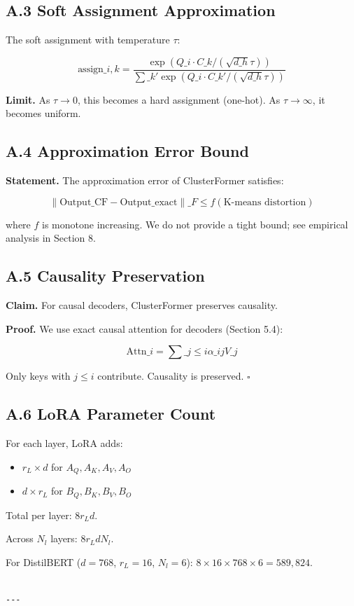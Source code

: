 \subsection{A.3 Soft Assignment Approximation}

The soft assignment with temperature $\tau$:

\[
\text{assign}\_{i,k} = \frac{\exp(Q\_i \cdot C\_k / (\sqrt{d\_h} \tau))}{\sum\_{k'} \exp(Q\_i \cdot C\_{k'} / (\sqrt{d\_h} \tau))}
\]

\textbf{Limit.} As $\tau \to 0$, this becomes a hard assignment (one-hot). As 
$\tau \to \infty$, it becomes uniform.

\subsection{A.4 Approximation Error Bound}

\textbf{Statement.} The approximation error of ClusterFormer satisfies:

\[
\|\text{Output}\_\text{CF} - \text{Output}\_\text{exact}\|\_F \leq f(\text{K-means distortion})
\]

where $f$ is monotone increasing. We do not provide a tight bound; see 
empirical analysis in Section 8.

\subsection{A.5 Causality Preservation}

\textbf{Claim.} For causal decoders, ClusterFormer preserves causality.

\textbf{Proof.} We use exact causal attention for decoders (Section 5.4):

\[
\text{Attn}\_i = \sum\_{j \leq i} \alpha\_{ij} V\_j
\]

Only keys with $j \leq i$ contribute. Causality is preserved. $\square$

\subsection{A.6 LoRA Parameter Count}

For each layer, LoRA adds:
\begin{itemize}
\item $r_L \times d$ for $A_Q, A_K, A_V, A_O$
\item $d \times r_L$ for $B_Q, B_K, B_V, B_O$

\end{itemize}
Total per layer: $8 r_L d$.

Across $N_l$ layers: $8 r_L d N_l$.

For DistilBERT ($d=768$, $r_L=16$, $N_l=6$): $8 \times 16 \times 768 \times 6 = 589{,}824$.
\begin{lstlisting}

---
\end{lstlisting}